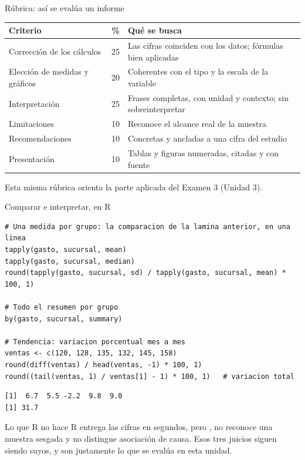 \documentclass[aspectratio=169,10pt]{beamer}
\begin{document}
\begin{frame}{Rúbrica: así se evalúa un informe}
  \scriptsize
  \begin{center}
  \begin{tabular}{@{}p{3.4cm}rp{6.6cm}@{}}
    \toprule
    \textbf{Criterio} & \textbf{\%} & \textbf{Qué se busca} \\
    \midrule
    Corrección de los cálculos & 25 &
      Las cifras coinciden con los datos; fórmulas bien aplicadas \\
    Elección de medidas y gráficos & 20 &
      Coherentes con el tipo y la escala de la variable \\
    Interpretación & 25 &
      Frases completas, con unidad y contexto; sin sobreinterpretar \\
    Limitaciones & 10 &
      Reconoce el alcance real de la muestra \\
    Recomendaciones & 10 &
      Concretas y ancladas a una cifra del estudio \\
    Presentación & 10 &
      Tablas y figuras numeradas, citadas y con fuente \\
    \bottomrule
  \end{tabular}
  \end{center}

  \vspace{0.05cm}
  {\tiny\color{uniGris} Esta misma rúbrica orienta la parte aplicada del
  Examen 3 (Unidad 3).}
\end{frame}

\begin{frame}[fragile]{Comparar e interpretar, en R}
  \scriptsize
\begin{lstlisting}[style=Rmini]
# Una medida por grupo: la comparacion de la lamina anterior, en una linea
tapply(gasto, sucursal, mean)
tapply(gasto, sucursal, median)
round(tapply(gasto, sucursal, sd) / tapply(gasto, sucursal, mean) * 100, 1)

# Todo el resumen por grupo
by(gasto, sucursal, summary)

# Tendencia: variacion porcentual mes a mes
ventas <- c(120, 128, 135, 132, 145, 158)
round(diff(ventas) / head(ventas, -1) * 100, 1)
round((tail(ventas, 1) / ventas[1] - 1) * 100, 1)   # variacion total
\end{lstlisting}
\begin{lstlisting}[style=Rout]
[1]  6.7  5.5 -2.2  9.8  9.0
[1] 31.7
\end{lstlisting}

  \vspace{-0.1cm}
  \begin{alertblock}{Lo que R no hace}
    \tiny
    R entrega las cifras en segundos, pero , no reconoce una muestra sesgada y no distingue asociación
    de causa. Esos tres juicios siguen siendo suyos, y son justamente lo que se
    evalúa en esta unidad.
  \end{alertblock}
\end{frame}
\end{document}
